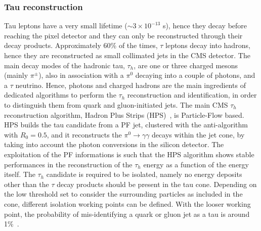 
\subsubsection{Tau reconstruction}
\noindent Tau leptons have a very small lifetime ($\sim 3 \times 10^{-13}$ s), hence they decay before reaching the pixel detector and they can only be reconstructed through their decay products. Approximately 60\% of the times, $\tau$ leptons decay into hadrons, hence they are reconstructed as small collimated jets in the CMS detector. The main decay modes of the hadronic tau, $\tau_h$, are one or three charged mesons (mainly $\pi^{\pm}$), also in association with a $\pi^0$ decaying into a couple of photons, and a $\tau$ neutrino. Hence, photons and charged hadrons are the main ingredients of dedicated algorithms to perform the $\tau_h$ reconstruction and identification, in order to distinguish them from quark and gluon-initiated jets. The main CMS $\tau_h$ reconstruction algorithm, Hadron Plus Strips (HPS)~\cite{Chatrchyan:2012zz}, is Particle-Flow based. HPS builds the tau candidate from a PF jet, clustered with the anti-\kt algorithm with $R_0 = 0.5$, and it reconstructs the $\pi^0 \rightarrow \gamma \gamma$ decays within the jet cone, by taking into account the photon conversions in the silicon detector. The exploitation of the PF informations is such that the HPS algorithm shows stable performances in the reconstruction of the $\tau_h$ energy as a function of the energy itself. The $\tau_h$ candidate is required to be isolated, namely no energy deposits other than the $\tau$ decay products should be present in the tau cone. Depending on the low threshold set to consider the surrounding particles as included in the cone, different isolation working points can be defined. With the looser working point, the probability of mis-identifying a quark or gluon jet as a tau is around 1\%~\cite{Chatrchyan:2012zz}.

